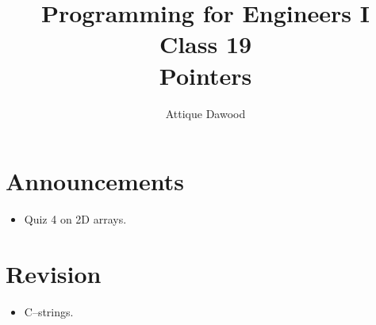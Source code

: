 \documentclass[12pt,a4paper]{article}
\title{\vspace{-2cm}Programming for Engineers I\\Class 19\\Pointers}
\author{Attique Dawood}
\begin{document}
\maketitle
\section{Announcements}
\begin{itemize}
\item Quiz 4 on 2D arrays.
\end{itemize}
\section{Revision}
\begin{itemize}
\item C--strings.
\end{itemize}
\end{document}
